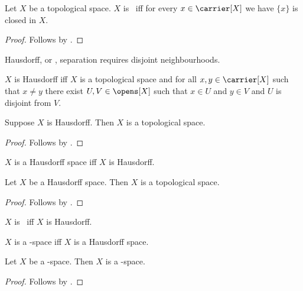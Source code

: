 \begin{theorem}\label{teeone_iff_singletons_closed}
    Let $X$ be a topological space.
    $X$ is \teeone\ iff for every $x\in\carrier[X]$ we have
        $\{x\}$ is closed in $X$.
\end{theorem}
\begin{proof}
    Follows by .
\end{proof}

Hausdorff, or \teetwo, separation requires disjoint neighbourhoods.

\begin{definition}\label{is_hausdorff}
    $X$ is Hausdorff iff $X$ is a topological space and
        for all $x,y\in\carrier[X]$ such that
            $x\neq y$ there exist $U,V\in\opens[X]$ such that
            $x\in U$ and $y\in V$ and $U$ is disjoint from $V$.
\end{definition}

\begin{classification}\label{hausdorff_is_topological}
    Suppose $X$ is Hausdorff.
    Then $X$ is a topological space.
\end{classification}
\begin{proof}
    Follows by .
\end{proof}

\begin{abbreviation}\label{hausdorff_space}
    $X$ is a Hausdorff space iff $X$ is Hausdorff.
\end{abbreviation}

\begin{classification}\label{hausdorff_space_is_topological}
    Let $X$ be a Hausdorff space.
    Then $X$ is a topological space.
\end{classification}
\begin{proof}
    Follows by .
\end{proof}

\begin{abbreviation}\label{teetwo}
    $X$ is \teetwo\ iff $X$ is Hausdorff.
\end{abbreviation}

\begin{abbreviation}\label{teetwo_space}
    $X$ is a \teetwo-space iff $X$ is a Hausdorff space.
\end{abbreviation}

\begin{proposition}\label{teeone_space_is_teezero_space}
    Let $X$ be a \teeone-space.
    Then $X$ is a \teezero-space.
\end{proposition}
\begin{proof}
    Follows by .
\end{proof}

